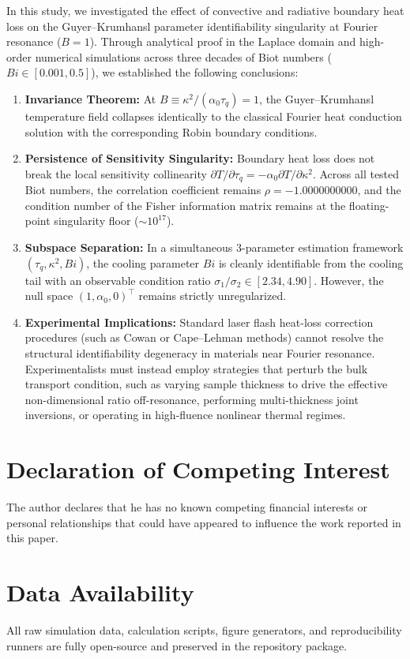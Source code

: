 \documentclass[review,12pt]{article}
\begin{document}
In this study, we investigated the effect of convective and radiative boundary heat loss on the Guyer--Krumhansl parameter identifiability singularity at Fourier resonance ($B = 1$). Through analytical proof in the Laplace domain and high-order numerical simulations across three decades of Biot numbers ($Bi \in [0.001, 0.5]$), we established the following conclusions:
\begin{enumerate}
    \item \textbf{Invariance Theorem:} At $B \equiv \kappa^2 / (\alpha_0 \tau_q) = 1$, the Guyer--Krumhansl temperature field collapses identically to the classical Fourier heat conduction solution with the corresponding Robin boundary conditions.
    \item \textbf{Persistence of Sensitivity Singularity:} Boundary heat loss does not break the local sensitivity collinearity $\partial T / \partial \tau_q = -\alpha_0 \partial T / \partial \kappa^2$. Across all tested Biot numbers, the correlation coefficient remains $\rho = -1.0000000000$, and the condition number of the Fisher information matrix remains at the floating-point singularity floor ($\sim 10^{17}$).
    \item \textbf{Subspace Separation:} In a simultaneous 3-parameter estimation framework $(\tau_q, \kappa^2, Bi)$, the cooling parameter $Bi$ is cleanly identifiable from the cooling tail with an observable condition ratio $\sigma_1 / \sigma_2 \in [2.34, 4.90]$. However, the null space $(1, \alpha_0, 0)^\top$ remains strictly unregularized.
    \item \textbf{Experimental Implications:} Standard laser flash heat-loss correction procedures (such as Cowan or Cape--Lehman methods) cannot resolve the structural identifiability degeneracy in materials near Fourier resonance. Experimentalists must instead employ strategies that perturb the bulk transport condition, such as varying sample thickness to drive the effective non-dimensional ratio off-resonance, performing multi-thickness joint inversions, or operating in high-fluence nonlinear thermal regimes.
\end{enumerate}

\section*{Declaration of Competing Interest}
The author declares that he has no known competing financial interests or personal relationships that could have appeared to influence the work reported in this paper.

\section*{Data Availability}
All raw simulation data, calculation scripts, figure generators, and reproducibility runners are fully open-source and preserved in the repository package.



\end{document}

